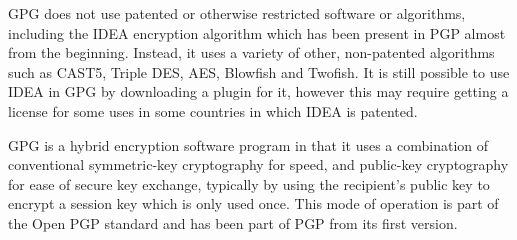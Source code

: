 GPG does not use patented or otherwise restricted software or
algorithms, including the IDEA encryption algorithm which has been
present in PGP almost from the beginning. Instead, it uses a variety of
other, non-patented algorithms such as CAST5, Triple DES, AES, Blowfish
and Twofish. It is still possible to use IDEA in GPG by downloading a
plugin for it, however this may require getting a license for some uses
in some countries in which IDEA is patented.

GPG is a hybrid encryption software program in that it uses a
combination of conventional symmetric-key cryptography for speed, and
public-key cryptography for ease of secure key exchange, typically by
using the recipient's public key to encrypt a session key which is only
used once. This mode of operation is part of the Open PGP standard and
has been part of PGP from its first version.
